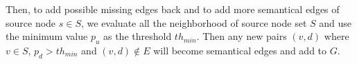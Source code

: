 Then, to add possible missing edges back and to add more semantical edges of source node ${s \in S}$, we evaluate all the neighborhood of source node set $S$ 
and use the minimum value $p_u$ as the threshold $th_{min}$. Then any new pairs $(v,d)$ where $v \in S$, $p_d > th_{min}$ and ${(v,d) \notin E}$ will become semantical edges and add to $G$.


















